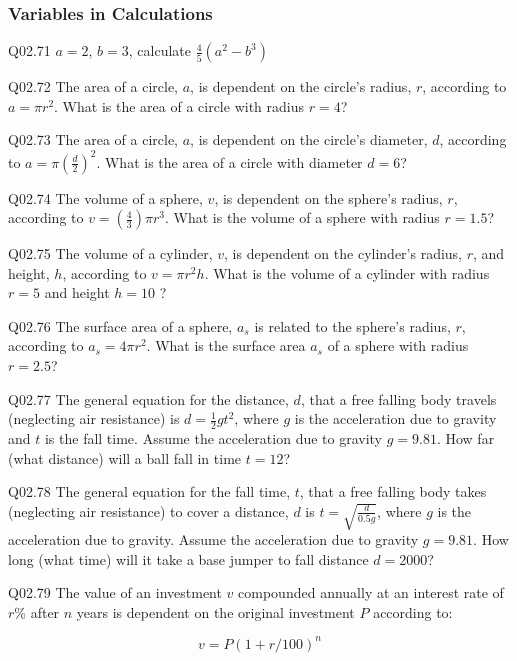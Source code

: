 \documentclass{book}
\newenvironment{problems}{}{}  %
\begin{document}
    
        \begin{problems}
        \subsubsection{Variables in
Calculations}\label{variables-in-calculations}

Q02.71 \(a = 2\), \(b = 3\), calculate \(\frac{4}{5}(a^2 - b^3)\)

Q02.72 The area of a circle, \(a\), is dependent on the circle's radius,
\(r\), according to \(a=\pi r^2\). What is the area of a circle with
radius \(r=4\)?

Q02.73 The area of a circle, \(a\), is dependent on the circle's
diameter, \(d\), according to \(a=\pi (\frac{d}{2})^2\). What is the
area of a circle with diameter \(d=6\)?

Q02.74 The volume of a sphere, \(v\), is dependent on the sphere's
radius, \(r\), according to \(v=(\frac{4}{3})\pi r^3\). What is the
volume of a sphere with radius \(r=1.5\)?

Q02.75 The volume of a cylinder, \(v\), is dependent on the cylinder's
radius, \(r\), and height, \(h\), according to \(v=\pi r^2 h\). What is
the volume of a cylinder with radius \(r=5\) and height \(h=10\) ?

Q02.76 The surface area of a sphere, \(a_s\) is related to the sphere's
radius, \(r\), according to \(a_s=4\pi r^2\). What is the surface area
\(a_s\) of a sphere with radius \(r=2.5\)?

Q02.77 The general equation for the distance, \(d\), that a free falling
body travels (neglecting air resistance) is \(d = \frac{1}{2}gt^2\),
where \(g\) is the acceleration due to gravity and \(t\) is the fall
time. Assume the acceleration due to gravity \(g = 9.81\). How far (what
distance) will a ball fall in time \(t = 12\)?

Q02.78 The general equation for the fall time, \(t\), that a free
falling body takes (neglecting air resistance) to cover a distance,
\(d\) is \(t = \sqrt{\frac{d}{0.5g}}\), where \(g\) is the acceleration
due to gravity. Assume the acceleration due to gravity \(g = 9.81\). How
long (what time) will it take a base jumper to fall distance
\(d = 2000\)?

Q02.79 The value of an investment \(v\) compounded annually at an
interest rate of \(r\%\) after \(n\) years is dependent on the original
investment \(P\) according to:

\[ v = P(1 + r/100)^n \]


\end{problems}
\end{document}
